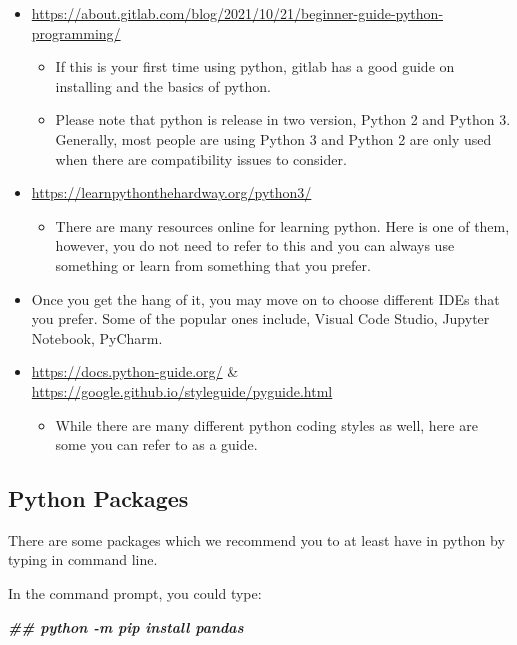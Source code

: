 \documentclass[
]{book}
\newenvironment{Shaded}{\begin{snugshade}}{\end{snugshade}}
\newcommand{\DocumentationTok}[1]{\textcolor[rgb]{0.56,0.35,0.01}{\textbf{\textit{#1}}}}
\providecommand{\tightlist}{%
  \setlength{\itemsep}{0pt}\setlength{\parskip}{0pt}}
\begin{document}
\begin{itemize}
\item
  \url{https://about.gitlab.com/blog/2021/10/21/beginner-guide-python-programming/}

  \begin{itemize}
  \item
    If this is your first time using python, gitlab has a good guide on installing and the basics of python.
  \item
    Please note that python is release in two version, Python 2 and Python 3. Generally, most people are using Python 3 and Python 2 are only used when there are compatibility issues to consider.
  \end{itemize}
\item
  \url{https://learnpythonthehardway.org/python3/}

  \begin{itemize}
  \tightlist
  \item
    There are many resources online for learning python. Here is one of them, however, you do not need to refer to this and you can always use something or learn from something that you prefer.
  \end{itemize}
\item
  Once you get the hang of it, you may move on to choose different IDEs that you prefer. Some of the popular ones include, Visual Code Studio, Jupyter Notebook, PyCharm.
\item
  \url{https://docs.python-guide.org/} \& \url{https://google.github.io/styleguide/pyguide.html}

  \begin{itemize}
  \tightlist
  \item
    While there are many different python coding styles as well, here are some you can refer to as a guide.
  \end{itemize}
\end{itemize}

\hypertarget{python-packages}{%
\subsection{Python Packages}\label{python-packages}}

There are some packages which we recommend you to at least have in python by typing in command line.

In the command prompt, you could type:

\begin{Shaded}
\begin{Highlighting}[]
\DocumentationTok{\#\# python {-}m pip install pandas}
\end{Highlighting}
\end{Shaded}
\end{document}
